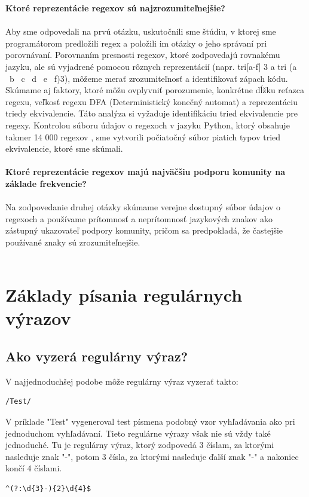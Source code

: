 \documentclass[10pt,twoside,slovak,a4paper]{article}
\begin{document}
\textbf{Ktoré reprezentácie regexov sú najzrozumiteľnejšie?} \\\\
Aby sme odpovedali na prvú otázku, uskutočnili sme štúdiu, v ktorej sme programátorom predložili regex a položili im otázky o jeho správaní pri porovnávaní. Porovnaním presnosti regexov, ktoré zodpovedajú rovnakému jazyku, ale sú vyjadrené pomocou rôznych reprezentácií (napr. tri[a-f] 3 a tri (a \textbar \ b \textbar \ c \textbar \ d \textbar \ e \textbar \ f)3), môžeme merať zrozumiteľnosť a identifikovať zápach kódu. \cite{Chapman2017} \\
Skúmame aj faktory, ktoré môžu ovplyvniť porozumenie, konkrétne dĺžku reťazca regexu, veľkosť regexu DFA (Deterministický konečný automat) a reprezentáciu triedy ekvivalencie. Táto analýza si vyžaduje identifikáciu tried ekvivalencie pre regexy. Kontrolou súboru údajov o regexoch v jazyku Python, ktorý obsahuje takmer 14 000 regexov \cite{Chapman2016}, sme vytvorili počiatočný súbor piatich typov tried ekvivalencie, ktoré sme skúmali.\cite{Chapman2017}\\\\
\textbf{Ktoré reprezentácie regexov majú najväčšiu podporu komunity na základe frekvencie?} \\\\
Na zodpovedanie druhej otázky skúmame verejne dostupný súbor údajov o regexoch \cite{Chapman2016} a používame prítomnosť a neprítomnosť jazykových znakov ako zástupný ukazovateľ podpory komunity, pričom sa predpokladá, že častejšie používané znaky sú zrozumiteľnejšie.\cite{Chapman2017}\\\\

\section{Základy písania regulárnych výrazov}
\subsection{Ako vyzerá regulárny výraz?}
V najjednoduchšej podobe môže regulárny výraz vyzerať takto:
\begin{lstlisting}[frame=single, basicstyle=\ttfamily\small, label=code:example]
	/Test/
	\end{lstlisting}

V príklade "Test" vygeneroval test písmena podobný vzor vyhľadávania ako pri jednoduchom vyhľadávaní.
Tieto regulárne výrazy však nie sú vždy také jednoduché. Tu je regulárny výraz, ktorý zodpovedá 3 číslam, za ktorými nasleduje znak "-", potom 3 čísla, za ktorými nasleduje ďalší znak "-" a nakoniec končí 4 číslami.
\begin{lstlisting}[frame=single, basicstyle=\ttfamily\small, label=code:example]
	^(?:\d{3}-){2}\d{4}$
	\end{lstlisting}
\end{document}
